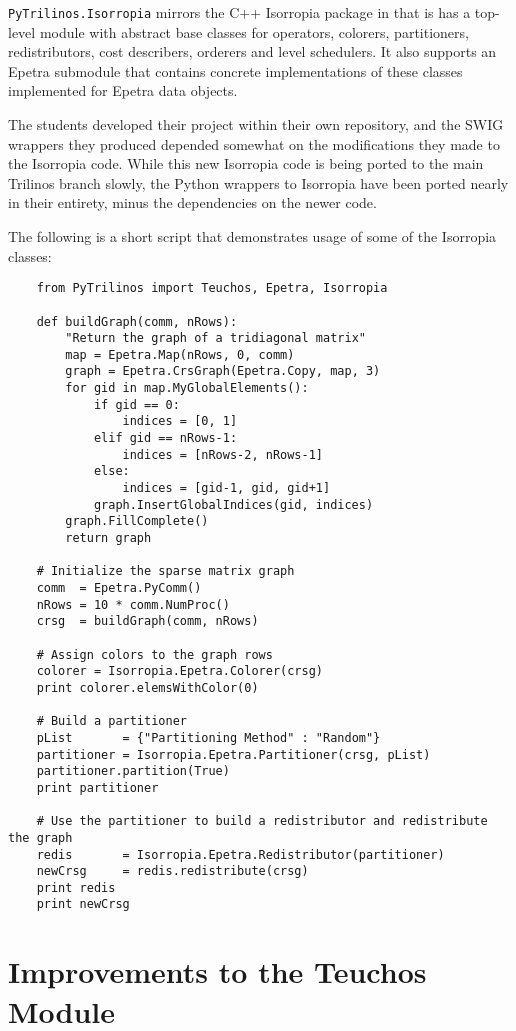 \documentclass[11pt]{article}
\begin{document}
{\tt PyTrilinos.Isorropia} mirrors the C++ Isorropia package in that is has a top-level module with abstract base classes for operators, colorers, partitioners, redistributors, cost describers, orderers and level schedulers.  It also supports an Epetra submodule that contains concrete implementations of these classes implemented for Epetra data objects.

The students developed their project within their own repository, and the SWIG wrappers they produced depended somewhat on the modifications they made to the Isorropia code.  While this new Isorropia code is being ported to the main Trilinos branch slowly, the Python wrappers to Isorropia have been ported nearly in their entirety, minus the dependencies on the newer code.

The following is a short script that demonstrates usage of some of the Isorropia classes:
\begin{verbatim}
    from PyTrilinos import Teuchos, Epetra, Isorropia
    
    def buildGraph(comm, nRows):
        "Return the graph of a tridiagonal matrix"
        map = Epetra.Map(nRows, 0, comm)
        graph = Epetra.CrsGraph(Epetra.Copy, map, 3)
        for gid in map.MyGlobalElements():
            if gid == 0:
                indices = [0, 1]
            elif gid == nRows-1:
                indices = [nRows-2, nRows-1]
            else:
                indices = [gid-1, gid, gid+1]
            graph.InsertGlobalIndices(gid, indices)
        graph.FillComplete()
        return graph

    # Initialize the sparse matrix graph
    comm  = Epetra.PyComm()
    nRows = 10 * comm.NumProc()
    crsg  = buildGraph(comm, nRows)

    # Assign colors to the graph rows
    colorer = Isorropia.Epetra.Colorer(crsg)
    print colorer.elemsWithColor(0)

    # Build a partitioner
    pList       = {"Partitioning Method" : "Random"}
    partitioner = Isorropia.Epetra.Partitioner(crsg, pList)
    partitioner.partition(True)
    print partitioner

    # Use the partitioner to build a redistributor and redistribute the graph
    redis       = Isorropia.Epetra.Redistributor(partitioner)
    newCrsg     = redis.redistribute(crsg)
    print redis
    print newCrsg
\end{verbatim}

\section{Improvements to the Teuchos Module}
\label{sec:teuchos}
\end{document}

